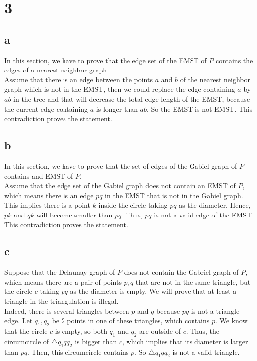 \section*{3}
\subsection*{a}
In this section, we have to prove that the edge set of the EMST of $P$ contains the edges of a nearest neighbor graph.\\

Assume that there is an edge between the points $ a $ and $ b $ of the nearest neighbor graph which is not in the EMST, then we could replace the edge containing $a$ by $ab$ in the tree and that will decrease the total edge length of the EMST, because the current edge containing $a$ is longer than $ab$. So the EMST is not EMST. This contradiction proves the statement.

\subsection*{b}
In this section, we have to prove that the set of edges of the Gabiel graph of $P$ contains and EMST of $P$. \\

Assume that the edge set of the Gabiel graph does not contain an EMST of $P$, which means there is an edge $pq$ in the EMST that is not in the Gabiel graph. \\

This implies there is a point $k$ inside the circle taking $pq$ as the diameter. Hence,
$pk$ and $qk$ will become smaller than $pq$. Thus, $pq$ is not a valid edge of the EMST.
This contradiction proves the statement.

\subsection*{c}
Suppose that the Delaunay graph of $P$ does not contain the Gabriel graph of $P$, which means there are a pair of points ${p, q}$ that are not in the same triangle, but the circle $c$ taking $pq$ as the diameter is empty. We will prove that at least a triangle in the triangulation is illegal. \\

Indeed, there is several triangles between $p$ and $q$ because $pq$ is not a triangle edge. Let $q_1, q_2$ be 2 points in one of these triangles, which contains $p$.
We know that the circle $c$ is empty, so both $q_1$ and $q_2$ are outside of $c$. Thus, the 
circumcircle of $\bigtriangleup q_1 q q_2$ is bigger than $c$, which implies that its diameter is larger than $pq$. Then, this circumcircle contains $p$. So $\bigtriangleup q_1 q q_2$ is not a valid triangle. \\

